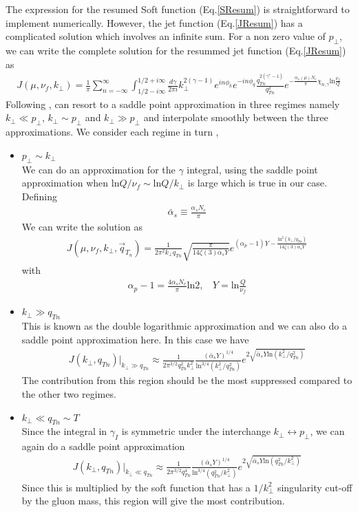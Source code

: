 \documentclass[letter,11pt]{article}
\newcommand{\bea}{\begin{eqnarray}}
\newcommand{\eea}{\end{eqnarray}}
\def\ln{\textrm{ln}}
\begin{document}
The expression for the resumed Soft function (Eq.\ref{SResum}) is straightforward to implement numerically. However, the jet function (Eq.\ref{JResum}) has a complicated solution which involves an infinite sum. For a non zero value of $p_{\perp}$, we can write the complete solution for the resummed jet function (Eq.\ref{JResum}) as 
\bea
J(\mu, \nu_f, k_{\perp}) =\frac{1}{\pi}\sum_{n=-\infty}^{\infty}\int_{1/2-i\infty}^{1/2+i\infty}\frac{d\gamma}{2\pi i} k_{\perp}^{2(\gamma-1)}e^{in\phi_k}e^{-in\phi_q}\frac{q_{Tn}^{2(\gamma^*-1)}}{q_{Tn}^2} e^{ -\frac{\alpha_s(\mu) N_c}{\pi}\chi_{n,\gamma}\ln \frac{\nu_f}{Q}} 
\eea
 Following \cite{Kovchegov:2012mbw}, can resort to a saddle point approximation in three regimes namely $k_{\perp} \ll p_{\perp}$, $k_{\perp} \sim p_{\perp}$ and $ k_{\perp} \gg p_{\perp}$ and interpolate smoothly between the three approximations. 
We consider each regime in turn ,

\begin{itemize}
\item{ $p_{\perp} \sim k_{\perp}$}\\
We can do an approximation for the $\gamma$ integral, using the saddle point approximation  when $\ln Q/\nu_f \sim \ln Q/k_{\perp}$ is large which is true in our case. Defining 
\bea
\bar \alpha_s \equiv \frac{\alpha_sN_c}{\pi}   
\eea
We can write the solution as 
\bea
 J(\mu, \nu_f, k_{\perp},\vec{q}_{T_n}) =\frac{1}{2\pi^2k_{\perp}q_{Tn}}\sqrt{\frac{\pi}{14\zeta(3)\bar \alpha_s Y}}e^{(\alpha_p-1)Y-\frac{\ln^2(k_{\perp}/q_{Tn})}{14\zeta(3)\bar \alpha_s Y}}
\eea
with 
\bea
\alpha_p-1 =\frac{4\alpha_sN_c}{\pi}\ln 2, \ \ \ \ Y= \ln \frac{Q}{\nu_f}
\eea
\item{$k_{\perp} \gg q_{Tn}$}\\
This is known as the double logarithmic approximation and we can also do a saddle point approximation here. In this case we have 
\bea
J(k_{\perp},q_{Tn})\Big|_{k_{\perp}\gg q_{Tn}} \approx  \frac{1}{2\pi^{3/2}q_{Tn}^2k_{\perp}^2}\frac{(\bar \alpha_s Y)^{1/4}}{\ln^{3/4}\left(k_{\perp}^2/q_{Tn}^2\right)}e^{2\sqrt{\bar \alpha_sY\ln(k_{\perp}^2/q_{Tn}^2)}}
\eea
The contribution from this region should be the most suppressed compared to the other two regimes.
\item{$k_{\perp} \ll q_{Tn} \sim T$}\\
Since the integral in $\gamma_I$ is symmetric under the interchange $k_{\perp} \leftrightarrow p_{\perp}$, we can again do a saddle point approximation
\bea
 J(k_{\perp}, q_{Tn})\Big|_{k_{\perp}\ll q_{Tn}} \approx \frac{1}{2\pi^{3/2}q_{Tn}^4}\frac{(\bar \alpha_s Y)^{1/4}}{\ln^{3/4}\left(q_{Tn}^2/k_{\perp}^2\right)}e^{2\sqrt{\bar{\alpha}_s Y\ln(q_{Tn}^2/k_{\perp}^2)}}
\eea
Since this is multiplied by the soft function that has a $1/k_{\perp}^2$ singularity cut-off by the gluon mass, this region will give the most contribution. 
 \end{itemize}
\end{document}
